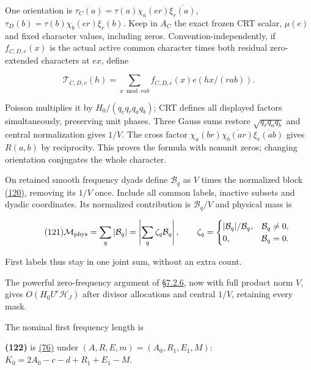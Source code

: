 One orientation is \(\tau_C(a)=\tau(a)\chi_a(er)\overline{\xi_r(a)}\), \(\tau_D(b)=\tau(b)\chi_b(er)\xi_r(b)\). Keep in \(A_C\) the exact frozen CRT scalar, \(\mu(e)\) and fixed character values, including zeros. Convention-independently, if \(f_{C,D,e}(x)\) is the actual active common character times both residual zero-extended characters at \(ex\), define

\[
\mathcal T_{C,D,e}(h)=\sum_{x\bmod rab}
            f_{C,D,e}(x)e(hx/(rab)).
\]

Poisson multiplies it by \(H_0/(q_eq_rq_aq_b)\); CRT defines all displayed factors simultaneously, preserving unit phases. Three Gauss sums restore \(\sqrt{q_rq_aq_b}\) and central normalization gives \(1/V\). The cross factor \(\chi_a(br)\overline{\chi_b(ar)}\overline{\xi_r(ab)}\) gives \(R(a,b)\) by reciprocity. This proves the formula with nonunit zeros; changing orientation conjugates the whole character.

On retained smooth frequency dyads define \(\mathcal B_q\) as \(V\) times the normalized block \protect\hyperlink{sr:first-poisson}{(120)}, removing its \(1/V\) once. Include all common labels, inactive subsets and dyadic coordinates. Its normalized contribution is \(\mathcal B_q/V\) and physical mass is

\hypertarget{sr:physical-mass}{}

\label{sr:physical-mass}

\[
\qquad\text{(121)}
 \mathcal M_{\rm phys}=\sum_q|\mathcal B_q|
   =\left|\sum_q\zeta_q\mathcal B_q\right|,\qquad
 \zeta_q=\begin{cases}|\mathcal B_q|/\mathcal B_q,&\mathcal B_q\ne0,\\
 0,&\mathcal B_q=0.\end{cases}
\]

First labels thus stay in one joint sum, without an extra count.

The powerful zero-frequency argument of §\protect\hyperlink{first-poisson-from-plain-products-to-gauss-polynomials}{7.2.6}, now with full product norm \(V\), gives \(O(H_0U^\epsilon\mathcal H_J)\) after divisor allocations and central \(1/V\), retaining every mask.

The nominal first frequency length is

\hypertarget{sr:first-scale}{}

\label{sr:first-scale}

\textbf{(122)} is \protect\hyperlink{cf:eq:D.12}{(76)} under \((A,R,E,m)=(A_0,R_1,E_1,M)\): \(K_0=2A_0-c-d+R_1+E_1-M\).

